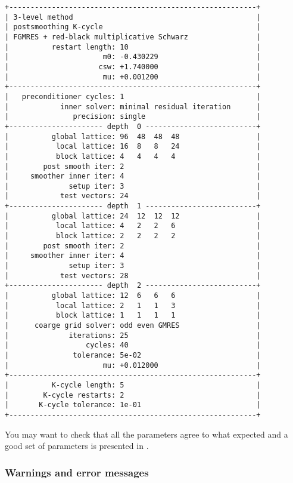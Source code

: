 \begin{Verbatim}[fontsize=\small]
+----------------------------------------------------------+
| 3-level method                                           |
| postsmoothing K-cycle                                    |
| FGMRES + red-black multiplicative Schwarz                |
|          restart length: 10                              |
|                      m0: -0.430229                       |
|                     csw: +1.740000                       |
|                      mu: +0.001200                       |
+----------------------------------------------------------+
|   preconditioner cycles: 1                               |
|            inner solver: minimal residual iteration      |
|               precision: single                          |
+---------------------- depth  0 --------------------------+
|          global lattice: 96  48  48  48                  |
|           local lattice: 16  8   8   24                  |
|           block lattice: 4   4   4   4                   |
|        post smooth iter: 2                               |
|     smoother inner iter: 4                               |
|              setup iter: 3                               |
|            test vectors: 24                              |
+---------------------- depth  1 --------------------------+
|          global lattice: 24  12  12  12                  |
|           local lattice: 4   2   2   6                   |
|           block lattice: 2   2   2   2                   |
|        post smooth iter: 2                               |
|     smoother inner iter: 4                               |
|              setup iter: 3                               |
|            test vectors: 28                              |
+---------------------- depth  2 --------------------------+
|          global lattice: 12  6   6   6                   |
|           local lattice: 2   1   1   3                   |
|           block lattice: 1   1   1   1                   |
|      coarge grid solver: odd even GMRES                  |
|              iterations: 25                              |
|                  cycles: 40                              |
|               tolerance: 5e-02                           |
|                      mu: +0.012000                       |
+----------------------------------------------------------+
|          K-cycle length: 5                               |
|        K-cycle restarts: 2                               |
|       K-cycle tolerance: 1e-01                           |
+----------------------------------------------------------+
\end{Verbatim}
You may want to check that all the parameters agree to what expected and a good set of parameters is presented in \cite{Alexandrou:2016izb}.
\subsubsection{Warnings and error messages}





